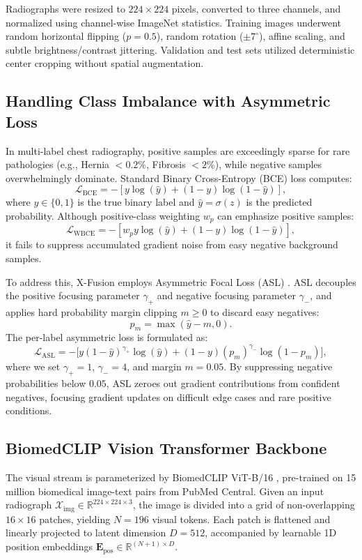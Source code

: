 \documentclass[conference]{IEEEtran}
\begin{document}
Radiographs were resized to $224 \times 224$ pixels, converted to three channels, and normalized using channel-wise ImageNet statistics. Training images underwent random horizontal flipping ($p=0.5$), random rotation ($\pm 7^\circ$), affine scaling, and subtle brightness/contrast jittering. Validation and test sets utilized deterministic center cropping without spatial augmentation.

\subsection{Handling Class Imbalance with Asymmetric Loss}
In multi-label chest radiography, positive samples are exceedingly sparse for rare pathologies (e.g., Hernia $<0.2\%$, Fibrosis $<2\%$), while negative samples overwhelmingly dominate. Standard Binary Cross-Entropy (BCE) loss computes:
\begin{equation}
\mathcal{L}_{\mathrm{BCE}} = -\left[ y \log(\hat{y}) + (1-y) \log(1-\hat{y}) \right],
\end{equation}
where $y \in \{0, 1\}$ is the true binary label and $\hat{y} = \sigma(z)$ is the predicted probability. Although positive-class weighting $w_p$ can emphasize positive samples:
\begin{equation}
\mathcal{L}_{\mathrm{WBCE}} = -\left[ w_p y \log(\hat{y}) + (1-y) \log(1-\hat{y}) \right],
\end{equation}
it fails to suppress accumulated gradient noise from easy negative background samples.

To address this, X-Fusion employs Asymmetric Focal Loss (ASL) \cite{ridnik2021asymmetric}. ASL decouples the positive focusing parameter $\gamma_+$ and negative focusing parameter $\gamma_-$, and applies hard probability margin clipping $m \ge 0$ to discard easy negatives:
\begin{equation}
p_{m} = \max(\hat{y} - m, 0).
\end{equation}
The per-label asymmetric loss is formulated as:
\begin{equation}
\mathcal{L}_{\mathrm{ASL}} = - \Big[ y (1 - \hat{y})^{\gamma_+} \log(\hat{y}) + (1 - y) (p_m)^{\gamma_-} \log(1 - p_m) \Big],
\end{equation}
where we set $\gamma_+ = 1$, $\gamma_- = 4$, and margin $m = 0.05$. By suppressing negative probabilities below $0.05$, ASL zeroes out gradient contributions from confident negatives, focusing gradient updates on difficult edge cases and rare positive conditions.

\subsection{BiomedCLIP Vision Transformer Backbone}
The visual stream is parameterized by BiomedCLIP ViT-B/16 \cite{zhang2023biomedclip}, pre-trained on 15 million biomedical image-text pairs from PubMed Central. Given an input radiograph $\mathcal{X}_{\mathrm{img}} \in \mathbb{R}^{224 \times 224 \times 3}$, the image is divided into a grid of non-overlapping $16 \times 16$ patches, yielding $N = 196$ visual tokens. Each patch is flattened and linearly projected to latent dimension $D=512$, accompanied by learnable 1D position embeddings $\mathbf{E}_{\mathrm{pos}} \in \mathbb{R}^{(N+1) \times D}$.
\end{document}
